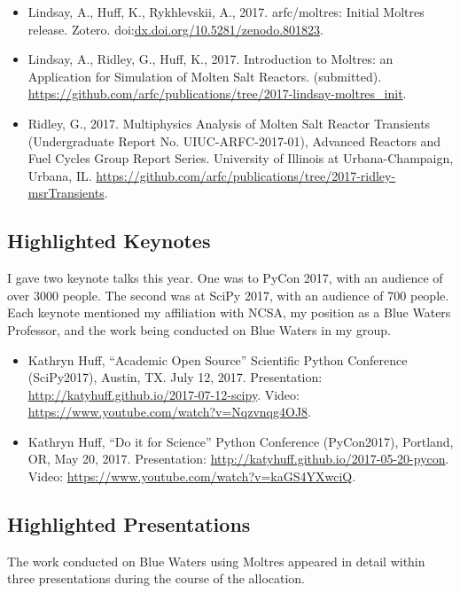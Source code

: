 \documentclass[letterpaper]{article}
\begin{document}
\begin{itemize}
	\item Lindsay, A., Huff, K., Rykhlevskii, A., 2017. arfc/moltres:
Initial Moltres release. Zotero. doi:\url{dx.doi.org/10.5281/zenodo.801823}.
        \item Lindsay, A., Ridley, G., Huff, K., 2017. Introduction to Moltres: an Application for Simulation of Molten Salt Reactors. (submitted). \url{https://github.com/arfc/publications/tree/2017-lindsay-moltres_init}.
        \item Ridley, G., 2017. Multiphysics Analysis of Molten Salt Reactor Transients (Undergraduate Report No. UIUC-ARFC-2017-01), Advanced Reactors and Fuel Cycles Group Report Series. University of Illinois at Urbana-Champaign, Urbana, IL. \url{https://github.com/arfc/publications/tree/2017-ridley-msrTransients}.
\end{itemize}

\subsection{Highlighted Keynotes} I gave two keynote talks 
this year. One was to PyCon 2017, with an audience of over 3000 people. The 
second was at SciPy 2017, with an audience of 700 people. Each keynote 
mentioned my affiliation with NCSA, my position as a Blue Waters Professor, and 
the work being conducted on Blue Waters in my group. 

\begin{itemize}
\item Kathryn Huff, ``Academic Open Source'' Scientific Python Conference 
(SciPy2017), Austin, TX. July 12, 2017.  
Presentation: \url{http://katyhuff.github.io/2017-07-12-scipy}. Video: 
\url{https://www.youtube.com/watch?v=Nqzvnqg4OJ8}.
\item Kathryn Huff, ``Do it for Science'' Python Conference (PyCon2017),
Portland, OR, May 20, 2017. Presentation: \url{http://katyhuff.github.io/2017-05-20-pycon}.
Video: \url{https://www.youtube.com/watch?v=kaGS4YXwciQ}.
\end{itemize}

\subsection{Highlighted Presentations} The work conducted on Blue Waters using 
Moltres appeared in detail within three presentations during the course of the 
allocation. 
\end{document}
